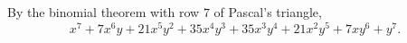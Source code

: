 By the binomial theorem with row $7$ of Pascal's triangle,
\[\boxed{x^7+7x^6y+21x^5y^2+35x^4y^3+35x^3y^4+21x^2y^5+7xy^6+y^7}.\]
